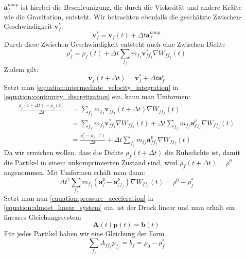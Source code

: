 \documentclass[11pt,
a4paper,
parskip=half, %
BCOR=10mm, %
english,
ngerman]{scrreprt}
\begin{document}
$\textbf{a}_f^{nonp}$ ist hierbei die Beschleunigung, die durch die Viskosität und andere Kräfte wie die Gravitation, entsteht.
Wir betrachten ebenfalls die geschätzte Zwischen-Geschwindigkeit $\textbf{v}_f^*$:
\begin{equation}
    \textbf{v}_f^* = \textbf{v}_f(t) + \Delta t \textbf{a}_f^{nonp}
\end{equation}
Durch diese Zwischen-Geschwindigkeit entsteht auch eine Zwischen-Dichte
\begin{equation}
    \rho_f^* = \rho_f(t) + \Delta t \sum_{f_f} m_{f_f} \textbf{v}_{ff_f}^* \nabla W_{ff_f}(t)
\end{equation}
Zudem gilt:
\begin{equation}
    \label{equation:intermediate_velocity_integration}
    \textbf{v}_f(t + \Delta t) = \textbf{v}_f^* + \Delta t \textbf{a}_f^p
\end{equation}
Setzt man \eqref{equation:intermediate_velocity_integration} in \eqref{equation:continuity_discretization} ein, kann man Umformen:
\begin{align}
    \frac{\rho_f(t+\Delta t) - \rho_f(t)}{\Delta t} &= \sum_{f_f} m_{f_f} \textbf{v}_{ff_f}(t+\Delta t) \nabla W_{ff_f}(t) \\
        &= \sum_{f_f} m_{f_f} \textbf{v}_{ff_f}^* \nabla W_{ff_f}(t) + \Delta t \sum_{f_f} m_{f_f} \textbf{a}_{ff_f}^p \nabla W_{ff_f}(t) \\
        &= \frac{\rho_f^* - \rho_f(t)}{\Delta t} + \Delta t \sum_{f_f} m_{f_f} \textbf{a}_{ff_f}^p \nabla W_{ff_f}(t)
\end{align}
Da wir erreichen wollen, dass die Dichte $\rho_f(t+\Delta t)$ die Ruhedichte ist, damit die Partikel in einem unkomprimierten Zustand sind,
wird $\rho_f(t+\Delta t) = \rho^0$ angenommen.
Mit Umformen erhält man dann:
\begin{equation}
    \label{equation:almost_linear_system}
    \Delta t^2 \sum_{f_f} m_{f_f} \left(\textbf{a}_f^p - \textbf{a}_{ff_f}^p\right) \nabla W_{ff_f}(t) = \rho^0 - \rho_f^*
\end{equation}
Setzt man nun \eqref{equation:pressure_acceleration} in \eqref{equation:almost_linear_system} ein, ist der Druck linear und man erhält ein lineares Gleichungssystem
\begin{equation}
    \textbf{A}(t) \textbf{p}(t) = \textbf{b}(t)
\end{equation}
Für jedes Partikel haben wir eine Gleichung der Form
\begin{equation}
    \sum_{f_f} A_{ff_f} p_{f_f} = b_f = \rho_0 - \rho_f^*
\end{equation}
\end{document}
